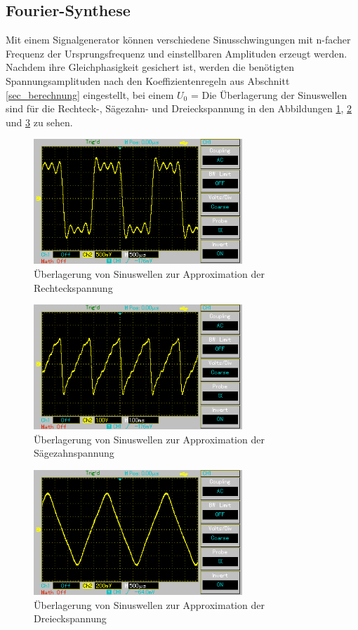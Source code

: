 \subsection{Fourier-Synthese}
Mit einem Signalgenerator können verschiedene Sinusschwingungen mit n-facher Frequenz der Ursprungsfrequenz und einstellbaren Amplituden
erzeugt werden. Nachdem ihre Gleichphasigkeit gesichert ist, werden die benötigten Spannungsamplituden nach den Koeffizientenregeln aus
Abschnitt \ref{sec_berechnung} eingestellt, bei einem $U_0$ =  Die Überlagerung der Sinuswellen sind für die Rechteck-, Sägezahn- und Dreieckspannung 
in den Abbildungen \ref{pic_rechteckoszi}, \ref{pic_saegzahnoszi} und \ref{pic_dreieckoszi} zu sehen.

\begin{figure}[H]
 \includegraphics[width = 0.7\textwidth]{pics/rechteck.png}
 \caption{Überlagerung von Sinuswellen zur Approximation der Rechteckspannung}
 \label{pic_rechteckoszi}
\end{figure}

\begin{figure}[H]
 \includegraphics[width = 0.7\textwidth]{pics/saegezahn.png}
 \caption{Überlagerung von Sinuswellen zur Approximation der Sägezahnspannung}
 \label{pic_saegzahnoszi}
\end{figure}

\begin{figure}[H]
 \includegraphics[width = 0.7\textwidth]{pics/dreieck.png}
 \caption{Überlagerung von Sinuswellen zur Approximation der Dreieckspannung}
 \label{pic_dreieckoszi}
\end{figure}

